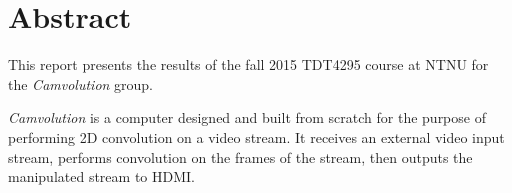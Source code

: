 \chapter*{Abstract}
This report presents the results of the fall 2015 TDT4295 course at NTNU for the \textit{Camvolution} group.

\textit{Camvolution} is a computer designed and built from scratch for the purpose of performing 2D convolution on a video stream.
It receives an external video input stream,
performs convolution on the frames of the stream,
then outputs the manipulated stream to HDMI.

